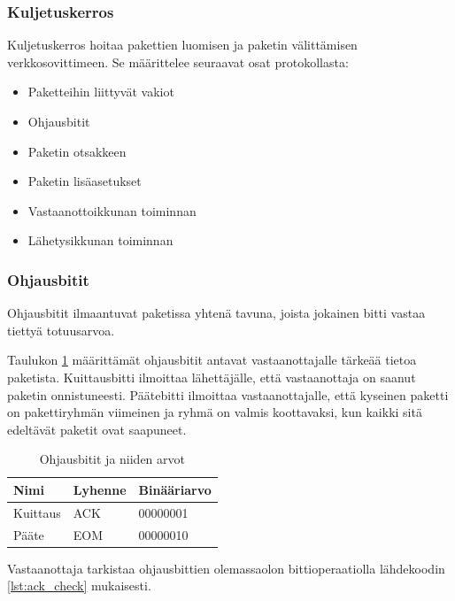\documentclass[a4paper,12pt]{article}
\begin{document}
    \subsubsection{Kuljetuskerros}\label{subsec:kuljetuskerros}
    Kuljetuskerros hoitaa pakettien luomisen ja paketin välittämisen verkkosovittimeen.
    Se määrittelee seuraavat osat protokollasta:

    \begin{itemize}
        \item Paketteihin liittyvät vakiot
        \item Ohjausbitit
        \item Paketin otsakkeen
        \item Paketin lisäasetukset
        \item Vastaanottoikkunan toiminnan
        \item Lähetysikkunan toiminnan
    \end{itemize}

    \subsubsection{Ohjausbitit}\label{subsec:control_bits}
    Ohjausbitit ilmaantuvat paketissa yhtenä tavuna, joista jokainen bitti vastaa tiettyä totuusarvoa.

    Taulukon \ref{tab:control_bits} määrittämät ohjausbitit antavat vastaanottajalle tärkeää tietoa paketista. Kuittausbitti ilmoittaa lähettäjälle, että vastaanottaja on saanut paketin onnistuneesti. Päätebitti ilmoittaa vastaanottajalle, että kyseinen paketti on pakettiryhmän viimeinen ja ryhmä on valmis koottavaksi, kun kaikki sitä edeltävät paketit ovat saapuneet. \par
    
    \begin{table}[h!]
        \centering
        \begin{tabular}{lll}
            Nimi     & Lyhenne & Binääriarvo \\
            \hline
            Kuittaus & ACK     & 00000001    \\
            Pääte    & EOM     & 00000010    \\
        \end{tabular}
        \caption{Ohjausbitit ja niiden arvot}
        \label{tab:control_bits}
    \end{table}


    Vastaanottaja tarkistaa ohjausbittien olemassaolon bittioperaatiolla lähdekoodin \ref{lst:ack_check} mukaisesti.
    
\end{document}
